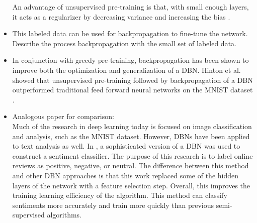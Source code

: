 \documentclass[12pt]{report}
\begin{document}
\begin{itemize}
An advantage of unsupervised pre-training is that, with small enough layers, it acts as a regularizer by decreasing variance and increasing the bias \cite{hinton_recognize_2007}.  
\item This labeled data can be used for backpropagation to fine-tune the network.
Describe the process backpropagation with the small set of labeled data.
\item In conjunction with greedy pre-training, backpropagation has been shown to improve both the optimization and generalization of a DBN. 
Hinton et al. showed that unsupervised pre-training followed by backpropagation of a DBN outperformed traditional feed forward neural networks on the MNIST dataset \cite{hinton_fast_2006}.
\item Analogous paper for comparison:\\
Much of the research in deep learning today is focused on image classification and analysis, such as the MNIST dataset.  However, DBNs have been applied to text analysis as well.  In \cite{ruangkanokmas_deep}, a sophisticated version of a DBN was used to construct a sentiment classifier. The purpose of this research is to label online reviews as positive, negative, or neutral.  The difference between this method and other DBN approaches is that this work replaced some of the hidden layers of the network with a feature selection step.  Overall, this improves the training learning efficiency of the algorithm.  This method can classify sentiments more accurately and train more quickly than previous semi-supervised algorithms.
\end{itemize}



\end{document}
